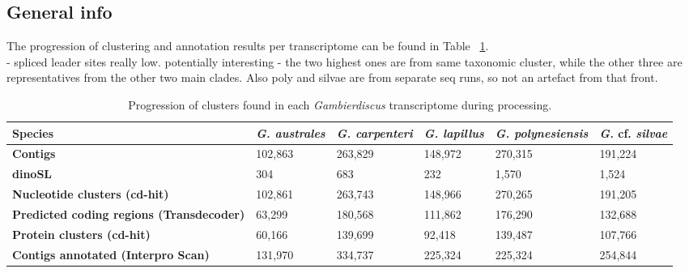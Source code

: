 \documentclass[12pt]{article}
\begin{document}
\subsection*{General info}
The progression of clustering and annotation results per transcriptome can be found in Table ~\ref{tbl:ClustTable}.\\
- spliced leader sites really low. potentially interesting - the two highest ones are from same taxonomic cluster, while the other three are representatives from the other two main clades. Also poly and silvae are from separate seq runs, so not an artefact from that front.

\begin{table}
\caption{Progression of clusters found in each \emph{Gambierdiscus} transcriptome during processing.}
\label{tbl:ClustTable}
\begin{tabular}{ | p{3cm} | p{2cm} | p{2.5cm} | p{2.5cm} | p{2cm} | p{2cm}|}
\hline
\textbf{Species}& \textit{G. australes}& \emph{G. carpenteri}&\emph{G. lapillus}&\emph{G. polynesiensis}&\emph{G.} cf. \emph{silvae}\\
\hline
\textbf{Contigs}&102,863&263,829&148,972&270,315&191,224\\
\hline
\textbf{dinoSL}&304&683&232&1,570&1,524\\
\hline
\textbf{Nucleotide clusters (cd-hit)}&102,861&263,743&148,966&270,265&191,205\\
\hline
\textbf{Predicted coding regions (Transdecoder)}&63,299&180,568&111,862&176,290&132,688\\
\hline
\textbf{Protein clusters (cd-hit)}&60,166&139,699&92,418&139,487&107,766\\
\hline
\textbf{Contigs annotated (Interpro Scan)}&131,970&334,737&225,324&225,324&254,844\\ 
\hline
\end{tabular}
\end{table}
\FloatBarrier
\newpage
\end{document}
